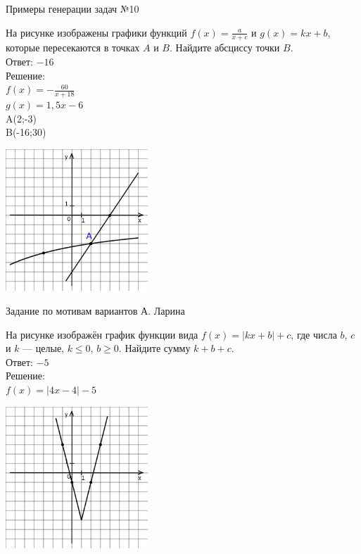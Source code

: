 \documentclass[aspectratio=169]{beamer}
\begin{document}
\begin{frame}{Примеры генерации задач №10}
    \begin{multicols}{2}
        На рисунке изображены графики функций $f(x)=\frac{a}{x+c}$ и $g(x)=kx+b$, которые пересекаются в точках $A$ и $B$. Найдите абсциссу точки $B$.\\

        Ответ: $-16$ \\

        Решение: \\
        $f(x)=-\frac{60}{x+18}$\\
        $g(x)=1,5x-6$\\
        A(2;-3)\\
        B(-16;30)

        \includegraphics[width=0.4\textwidth]{images/17222136364202n0.png}
    \end{multicols}
    

\end{frame}

\begin{frame}{Задание по мотивам вариантов А. Ларина}

    \begin{multicols}{2}
        На рисунке изображён график функции вида $f(x)=|kx+b|+c$, где числа $b$, $c$ и $k$ — целые, $k \leq 0$, $b\geq0$. Найдите сумму $k+b+c$.\\

        Ответ: $-5$\\

        Решение: \\
        $f(x)=|4x-4|-5$

        \includegraphics[width=0.4\textwidth]{images/453912618511153n0.png}
    
    \end{multicols}
\end{frame}
\end{document}
